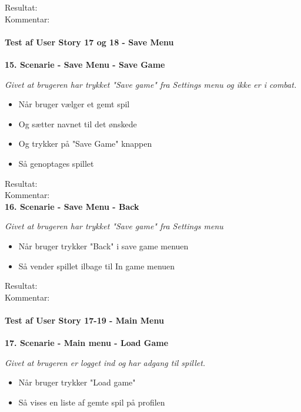 Resultat:\\
Kommentar:\\

\paragraph{Test af User Story 17 og 18 - Save Menu}

\textbf{15. Scenarie - Save Menu - Save Game}

\textit{Givet at brugeren har trykket "Save game" fra Settings menu og ikke er i combat.}

\begin{itemize}
  \item Når bruger vælger et gemt spil
  \item Og sætter navnet til det ønskede
  \item Og trykker på "Save Game" knappen
  \item Så genoptages spillet
\end{itemize}

Resultat:\\
Kommentar:\\

\textbf{16. Scenarie - Save Menu - Back}

\textit{Givet at brugeren har trykket "Save game" fra Settings menu}

\begin{itemize}
  \item Når bruger trykker "Back" i save game menuen
  \item Så vender spillet ilbage til In game menuen
\end{itemize}

Resultat:\\
Kommentar:

\paragraph{Test af User Story 17-19 - Main Menu}

\textbf{17. Scenarie - Main menu - Load Game}

\textit{Givet at brugeren er logget ind og har adgang til spillet.}

\begin{itemize}
  \item Når bruger trykker "Load game"
  \item Så vises en liste af gemte spil på profilen
\end{itemize}


